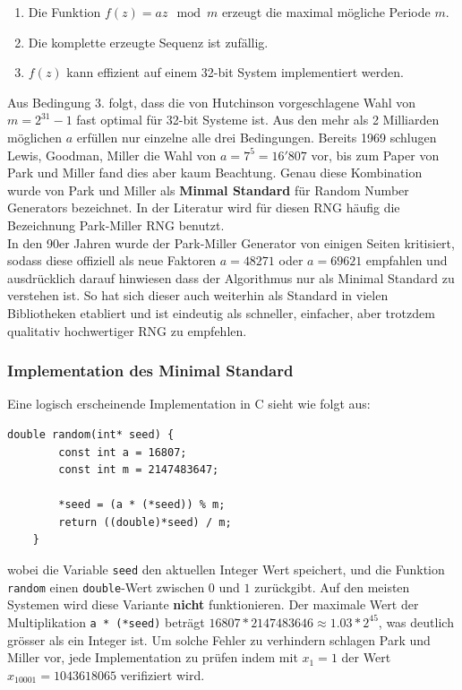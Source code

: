 \documentclass{book}
\begin{document}
\begin{refsection}
\begin{enumerate}
	\item Die Funktion $f(z) = a z \mod m$ erzeugt die maximal mögliche Periode $m$.
	\item Die komplette erzeugte Sequenz ist zufällig.
	\item $f(z)$ kann effizient auf einem 32-bit System implementiert werden.
\end{enumerate}

Aus Bedingung 3. folgt, dass die von Hutchinson \cite{rng:Hutchinson1966} vorgeschlagene Wahl von $m = 2^{31} - 1$ fast optimal für 32-bit Systeme ist. Aus den mehr als 2 Milliarden möglichen $a$ erfüllen nur einzelne alle drei Bedingungen. Bereits 1969 schlugen Lewis, Goodman, Miller \cite{rng:LewisGoodmanMiller1969} die Wahl von $a = 7^5 = 16'807$ vor, bis zum Paper von Park und Miller fand dies aber kaum Beachtung. Genau diese Kombination wurde von Park und Miller als \textbf{Minmal Standard}  für Random Number Generators bezeichnet. In der Literatur wird für diesen RNG häufig die Bezeichnung Park-Miller RNG benutzt. \\

In den 90er Jahren wurde der Park-Miller Generator von einigen Seiten kritisiert, sodass diese offiziell als neue Faktoren $a = 48271$ oder $a = 69621$ empfahlen und ausdrücklich darauf hinwiesen dass der Algorithmus nur als Minimal Standard zu verstehen ist. So hat sich dieser auch weiterhin als Standard in vielen Bibliotheken etabliert und ist eindeutig als schneller, einfacher, aber trotzdem qualitativ hochwertiger RNG zu empfehlen.

\newpage
\subsubsection{Implementation des Minimal Standard}
Eine logisch erscheinende Implementation in C sieht wie folgt aus:
\begin{lstlisting}[style=C]
	double random(int* seed) {
		const int a = 16807;
		const int m = 2147483647;
		
		*seed = (a * (*seed)) % m;
		return ((double)*seed) / m;
	}
\end{lstlisting}
wobei die Variable \texttt{seed} den aktuellen Integer Wert speichert, und die Funktion \texttt{random} einen \texttt{double}-Wert zwischen $0$ und $1$ zurückgibt. Auf den meisten Systemen wird diese Variante \textbf{nicht} funktionieren. Der maximale Wert der Multiplikation \texttt{a * (*seed)} beträgt $16807*2147483646 \approx 1.03 * 2^{45}$, was deutlich grösser als ein Integer ist. Um solche Fehler zu verhindern schlagen Park und Miller vor, jede Implementation zu prüfen indem mit $x_1 = 1$ der Wert $x_{10001} = 1043618065$ verifiziert wird. \\


\end{refsection}
\end{document}
